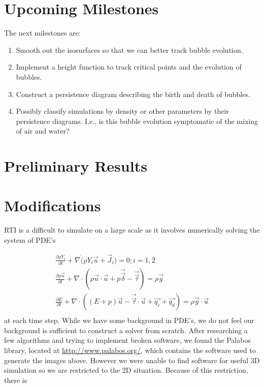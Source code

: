 \documentclass[12pt, fullpage,letterpaper]{article}
\begin{document}
	
	\section*{\normalfont Upcoming Milestones} The next milestones are:
	\begin{enumerate}
		\item Smooth out the isosurfaces so that we can better track bubble evolution.
		\item Implement a height function to track critical points and the evolution of bubbles.
		\item Construct a persistence diagram describing the birth and death of bubbles.
		\item Possibly classify simulations by density or other parameters by their persistence diagrams. I.e., is this bubble evolution symptomatic of the mixing of air and water?
	\end{enumerate} 

	\section*{\normalfont Preliminary Results}
	
	\section*{\normalfont Modifications} RTI is a difficult to simulate on a large scale as it involves numerically solving the system of PDE's
	
	\begin{gather*}
		\frac{\partial \rho Y_i}{\partial t} + \nabla \dot (\rho Y_i \vec{u} + \vec{J}_i) = 0; i = 1, 2 \\
		\frac{\partial \rho \vec{u}}{\partial t} + \nabla \cdot (\rho \vec{u} \cdot \vec{u} + p \vec{\vec{\delta}} - \vec{\vec{\tau}}) = \rho \vec{g} \\
		\frac{\partial E}{\partial t} + \nabla \cdot ((E + p)\vec{u} -\vec{\vec{\tau}}\cdot \vec{u} + \vec{q_c} + \vec{q_d} ) = \rho \vec{g} \cdot \vec{u} \\
	\end{gather*} 
	at each time step. While we have some background in PDE's, we do not feel our background is sufficient to construct a solver from scratch. After researching a few algorithms and trying to implement broken software, we found the Palabos library, located at \url{http://www.palabos.org/}, which contains the software used to generate the images above. However we were unable to find software for useful 3D simulation so we are restricted to the 2D situation. Because of this restriction, there is 
\end{document}
